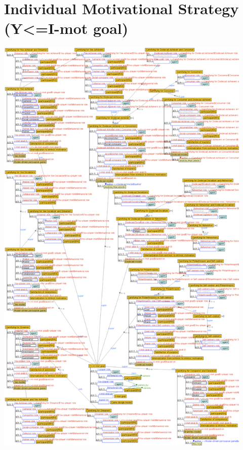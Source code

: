\section{Individual Motivational Strategy (Y<=I-mot goal)}
\label{sec:ontogacles:individual-motivational-strategy}
\includegraphics[width=0.92\textwidth]{images/appendix/ontological-structure-individual-motivational-strategy.png}

\newpage
